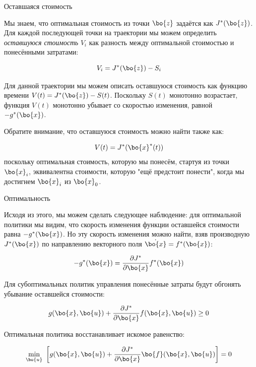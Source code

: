 \documentclass{beamer}
\begin{document}
\begin{frame}{Оставшаяся стоимость}
	\begin{flushleft}
		
		{\small 
		Мы знаем, что оптимальная стоимость из точки $\bo{z}$ задаётся как $J^*(\bo{z})$. Для каждой последующей точки на траектории мы можем определить \emph{оставшуюся стоимость} $V_i$ как разность между оптимальной стоимостью и понесёнными затратами:
		
		\begin{equation}
			V_i = J^*(\bo{z}) - S_i
		\end{equation}
		
		Для данной траектории мы можем описать оставшуюся стоимость как функцию времени $V(t) = J^*(\bo{z}) - S(t)$. Поскольку $S(t)$ монотонно возрастает, функция $V(t)$ монотонно убывает со скоростью изменения, равной $-g^*(\bo{x})$.
		
		\bigskip
		
		Обратите внимание, что оставшуюся стоимость можно найти также как:
		
		\begin{equation}
			V(t) = J^*(\bo{x}^*(t))
		\end{equation}
		поскольку оптимальная стоимость, которую мы понесём, стартуя из точки $\bo{x}_i$, эквивалентна стоимости, которую "ещё предстоит понести", когда мы достигнем $\bo{x}_i$ из $\bo{x}_0$.
	}
	
	\end{flushleft}
\end{frame}


\begin{frame}{Оптимальность}
	\begin{flushleft}
		
		Исходя из этого, мы можем сделать следующее наблюдение: для оптимальной политики мы видим, что скорость изменения функции оставшейся стоимости равна $-g^*(\bo{x})$. Но эту скорость изменения можно найти, взяв производную $J^*(\bo{x})$ по направлению векторного поля $\dot{\bo{x}} = f^*(\bo{x})$:
		
		\begin{equation}
			-g^*(\bo{x}) = \frac{\partial J^*}{\partial \bo{x}} f^*(\bo{x})
		\end{equation}
		
		Для субоптимальных политик управления понесённые затраты будут обгонять убывание оставшейся стоимости:
		
		\begin{equation}
			g(\bo{x}, \bo{u}) + \frac{\partial J^*}{\partial \bo{x}} f(\bo{x}, \bo{u}) \geq 0
		\end{equation}
		
		Оптимальная политика восстанавливает искомое равенство:
		
		\begin{equation}
			\underset{\bo{u}}{\min} \ 
			\left[ 
			g(\bo{x}, \bo{u}) + 
			\frac{\partial J^*}{\partial \bo{x}} \bo{f} (\bo{x}, \bo{u}) 
			\right] = 0
		\end{equation}
		
	\end{flushleft}
\end{frame}
\end{document}
